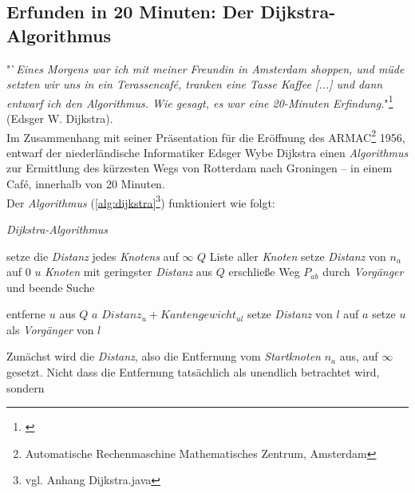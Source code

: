 \documentclass[12pt]{article}
\begin{document}
\subsection{Erfunden in 20 Minuten: Der Dijkstra-Algorithmus}
"`{\em Eines Morgens war ich mit meiner Freundin in Amsterdam shoppen, und müde setzten wir uns in ein Terassencafé, tranken eine Tasse Kaffee [...] und dann entwarf ich den Algorithmus. Wie gesagt, es war eine 20-Minuten Erfindung.}"\footnote{\cite[(engl.), S. 42f]{interview}} (Edsger W. Dijkstra).
\\
Im Zusammenhang mit seiner Präsentation für die Eröffnung des ARMAC\footnote{Automatische Rechenmaschine Mathematisches Zentrum, Amsterdam} 1956, entwarf der niederländische Informatiker Edsger Wybe Dijkstra einen \textit{Algorithmus} zur Ermittlung des kürzesten Wegs von Rotterdam nach Groningen -- in einem Café, innerhalb von 20 Minuten. 
\\
Der \textit{Algorithmus} (\autoref{alg:dijkstra}\footnote{vgl. Anhang Dijkstra.java}) funktioniert wie folgt:
\begin{algorithm}
\caption{\textit{Dijkstra-Algorithmus} \label{alg:dijkstra}}
\begin{algorithmic}[1]
\Statex
{}
\Statex
{}
	\State setze die \textit{Distanz} jedes  \textit{Knotens} auf $\infty$
	\State \sei $Q$ Liste aller \textit{Knoten}
	\State setze \textit{Distanz} von $n_a$ auf $0$
		\State \sei $u$ \textit{Knoten} mit geringster \textit{Distanz} aus $Q$
			\State erschließe Weg $P_{ab}$ durch \textit{Vorgänger} und beende Suche
		\EndIf		
		
		\State entferne $u$ aus $Q$
			\State \sei $a$ $Distanz_u + Kantengewicht_{ul}$
				\State setze \textit{Distanz} von $l$ auf $a$
				\State setze $u$ als \textit{Vorgänger} von $l$
			\EndIf
		\EndFor
	\EndWhile
\EndProcedure
\end{algorithmic}
\end{algorithm}
\newpage
\noindent Zunächst wird die \textit{Distanz}, also die Entfernung vom \textit{Startknoten} $n_a$ aus, auf $\infty$ gesetzt. Nicht dass die Entfernung tatsächlich als unendlich betrachtet wird, sondern 
\end{document}
